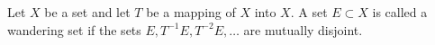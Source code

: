 Let $X$ be a set and let $T$ be a mapping of $X$ into $X$. A set $E \subset X$ is called a wandering set if the sets $E, T^{-1}E, T^{-2}E, \ldots$ are mutually disjoint.